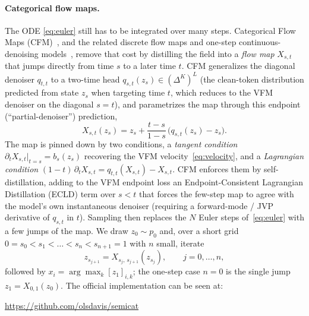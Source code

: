 \documentclass[twocolumn]{style}
\begin{document}
\paragraph{Categorical flow maps.} The ODE \eqref{eq:euler} still has to be integrated over many steps. Categorical Flow Maps (CFM)~\citep{roos2026cfm}, and the related discrete flow maps and one-step continuous-denoising models~\citep{potaptchik2026dfm, lee2026onestep}, remove that cost by distilling the field into a \emph{flow map} $X_{s,t}$ that jumps directly from time $s$ to a later time $t$. CFM generalizes the diagonal denoiser $q_{t,t}$ to a two-time head $q_{s,t}(z_s)\in(\Delta^K)^L$ (the clean-token distribution predicted from state $z_s$ when targeting time $t$, which reduces to the VFM denoiser on the diagonal $s=t$), and parametrizes the map through this endpoint (``partial-denoiser'') prediction,
\begin{equation}
X_{s,t}(z_s)=z_s+\frac{t-s}{1-s}\,\bigl(q_{s,t}(z_s)-z_s\bigr).
\label{eq:endpoint}
\end{equation}
The map is pinned down by two conditions, a \emph{tangent condition} $\partial_t X_{s,t}\big|_{t=s}=b_s(z_s)$ recovering the VFM velocity~\eqref{eq:velocity}, and a \emph{Lagrangian condition} $(1-t)\,\partial_t X_{s,t}=q_{t,t}(X_{s,t})-X_{s,t}$. CFM enforces them by self-distillation, adding to the VFM endpoint loss an Endpoint-Consistent Lagrangian Distillation (ECLD) term over $s<t$ that forces the few-step map to agree with the model's own instantaneous denoiser (requiring a forward-mode / JVP derivative of $q_{s,t}$ in $t$). Sampling then replaces the $N$ Euler steps of~\eqref{eq:euler} with a few jumps of the map. We draw $z_0\sim p_0$ and, over a short grid $0=s_0<s_1<\dots<s_n<s_{n+1}=1$ with $n$ small, iterate
\begin{equation}
z_{s_{j+1}}=X_{s_j,\,s_{j+1}}(z_{s_j}),\qquad j=0,\dots,n,
\label{eq:cfmsample}
\end{equation}
followed by $x_i=\arg\max_k[z_1]_{i,k}$; the one-step case $n=0$ is the single jump $z_1=X_{0,1}(z_0)$. The official implementation can be seen at:

\begin{center}
    \url{https://github.com/olsdavis/semicat}
\end{center}
\end{document}

